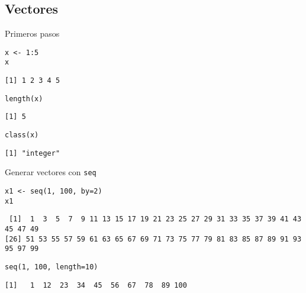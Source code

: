 \documentclass[xcolor={usenames,svgnames,dvipsnames}]{beamer}
\begin{document}
\subsection{Vectores}
\label{sec:orgaed425a}

\begin{frame}[fragile,label={sec:org7f6e745}]{Primeros pasos}
 \lstset{language=r,label= ,caption= ,captionpos=b,numbers=none}
\begin{lstlisting}
x <- 1:5
x
\end{lstlisting}

\begin{verbatim}
[1] 1 2 3 4 5
\end{verbatim}

\lstset{language=r,label= ,caption= ,captionpos=b,numbers=none}
\begin{lstlisting}
length(x)
\end{lstlisting}

\begin{verbatim}
[1] 5
\end{verbatim}

\lstset{language=r,label= ,caption= ,captionpos=b,numbers=none}
\begin{lstlisting}
class(x)
\end{lstlisting}

\begin{verbatim}
[1] "integer"
\end{verbatim}
\end{frame}


\begin{frame}[fragile,label={sec:orgdb8f322}]{Generar vectores con \texttt{seq}}
 \lstset{language=r,label= ,caption= ,captionpos=b,numbers=none}
\begin{lstlisting}
x1 <- seq(1, 100, by=2)
x1
\end{lstlisting}

\begin{verbatim}
 [1]  1  3  5  7  9 11 13 15 17 19 21 23 25 27 29 31 33 35 37 39 41 43 45 47 49
[26] 51 53 55 57 59 61 63 65 67 69 71 73 75 77 79 81 83 85 87 89 91 93 95 97 99
\end{verbatim}

\lstset{language=r,label= ,caption= ,captionpos=b,numbers=none}
\begin{lstlisting}
seq(1, 100, length=10)
\end{lstlisting}

\begin{verbatim}
[1]   1  12  23  34  45  56  67  78  89 100
\end{verbatim}
\end{frame}
\end{document}
